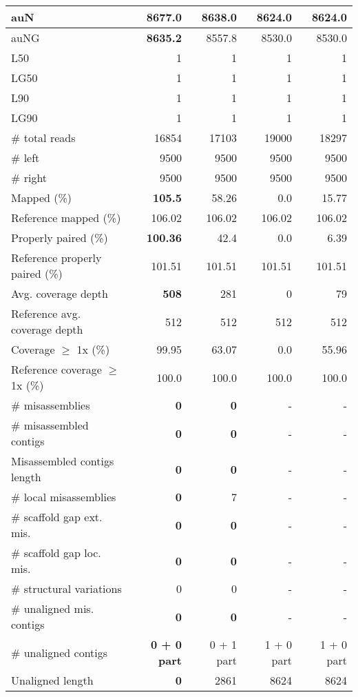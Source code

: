 \documentclass[12pt,a4paper]{article}
\begin{document}
\begin{table}[ht]
\begin{center}
\begin{tabular}{|l*{4}{|r}|}
auN & {\bf 8677.0} & 8638.0 & 8624.0 & 8624.0 \\ \hline
auNG & {\bf 8635.2} & 8557.8 & 8530.0 & 8530.0 \\ \hline
L50 & 1 & 1 & 1 & 1 \\ \hline
LG50 & 1 & 1 & 1 & 1 \\ \hline
L90 & 1 & 1 & 1 & 1 \\ \hline
LG90 & 1 & 1 & 1 & 1 \\ \hline
\# total reads & 16854 & 17103 & 19000 & 18297 \\ \hline
\# left & 9500 & 9500 & 9500 & 9500 \\ \hline
\# right & 9500 & 9500 & 9500 & 9500 \\ \hline
Mapped (\%) & {\bf 105.5} & 58.26 & 0.0 & 15.77 \\ \hline
Reference mapped (\%) & 106.02 & 106.02 & 106.02 & 106.02 \\ \hline
Properly paired (\%) & {\bf 100.36} & 42.4 & 0.0 & 6.39 \\ \hline
Reference properly paired (\%) & 101.51 & 101.51 & 101.51 & 101.51 \\ \hline
Avg. coverage depth & {\bf 508} & 281 & 0 & 79 \\ \hline
Reference avg. coverage depth & 512 & 512 & 512 & 512 \\ \hline
Coverage $\geq$ 1x (\%) & 99.95 & 63.07 & 0.0 & 55.96 \\ \hline
Reference coverage $\geq$ 1x (\%) & 100.0 & 100.0 & 100.0 & 100.0 \\ \hline
\# misassemblies & {\bf 0} & {\bf 0} & - & - \\ \hline
\# misassembled contigs & {\bf 0} & {\bf 0} & - & - \\ \hline
Misassembled contigs length & {\bf 0} & {\bf 0} & - & - \\ \hline
\# local misassemblies & {\bf 0} & 7 & - & - \\ \hline
\# scaffold gap ext. mis. & {\bf 0} & {\bf 0} & - & - \\ \hline
\# scaffold gap loc. mis. & {\bf 0} & {\bf 0} & - & - \\ \hline
\# structural variations & 0 & 0 & - & - \\ \hline
\# unaligned mis. contigs & {\bf 0} & {\bf 0} & - & - \\ \hline
\# unaligned contigs & {\bf 0 + 0 part} & 0 + 1 part & 1 + 0 part & 1 + 0 part \\ \hline
Unaligned length & {\bf 0} & 2861 & 8624 & 8624 \\ \hline

\end{tabular}
\end{center}
\end{table}
\end{document}
